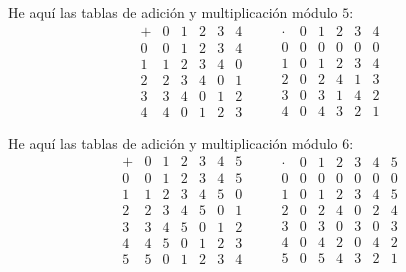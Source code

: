 \documentclass{article}
\begin{document}
\begin{ejemplo}
  He aquí las tablas de adición y multiplicación módulo $5$:
  \[
    \begin{array}{c|ccccc}
      + & 0 & 1 & 2 & 3 & 4 \\
      \hline
      0 & 0 & 1 & 2 & 3 & 4 \\
      1 & 1 & 2 & 3 & 4 & 0 \\
      2 & 2 & 3 & 4 & 0 & 1 \\
      3 & 3 & 4 & 0 & 1 & 2 \\
      4 & 4 & 0 & 1 & 2 & 3
    \end{array}
    \quad\quad
    \begin{array}{c|ccccc}
      \cdot & 0 & 1 & 2 & 3 & 4 \\
      \hline
      0 & 0 & 0 & 0 & 0 & 0 \\
      1 & 0 & 1 & 2 & 3 & 4 \\
      2 & 0 & 2 & 4 & 1 & 3 \\
      3 & 0 & 3 & 1 & 4 & 2 \\
      4 & 0 & 4 & 3 & 2 & 1
    \end{array}
  \]
\end{ejemplo}

\begin{ejemplo}
  He aquí las tablas de adición y multiplicación módulo $6$:
  \[
    \begin{array}{c|cccccc}
      + & 0 & 1 & 2 & 3 & 4 & 5 \\
      \hline
      0 & 0 & 1 & 2 & 3 & 4 & 5 \\
      1 & 1 & 2 & 3 & 4 & 5 & 0 \\
      2 & 2 & 3 & 4 & 5 & 0 & 1 \\
      3 & 3 & 4 & 5 & 0 & 1 & 2 \\
      4 & 4 & 5 & 0 & 1 & 2 & 3 \\
      5 & 5 & 0 & 1 & 2 & 3 & 4
    \end{array}
    \quad\quad
    \begin{array}{c|cccccc}
      \cdot & 0 & 1 & 2 & 3 & 4 & 5 \\
      \hline
      0 & 0 & 0 & 0 & 0 & 0 & 0 \\
      1 & 0 & 1 & 2 & 3 & 4 & 5 \\
      2 & 0 & 2 & 4 & 0 & 2 & 4 \\
      3 & 0 & 3 & 0 & 3 & 0 & 3 \\
      4 & 0 & 4 & 2 & 0 & 4 & 2 \\
      5 & 0 & 5 & 4 & 3 & 2 & 1
    \end{array}
  \]
\end{ejemplo}
\end{document}

